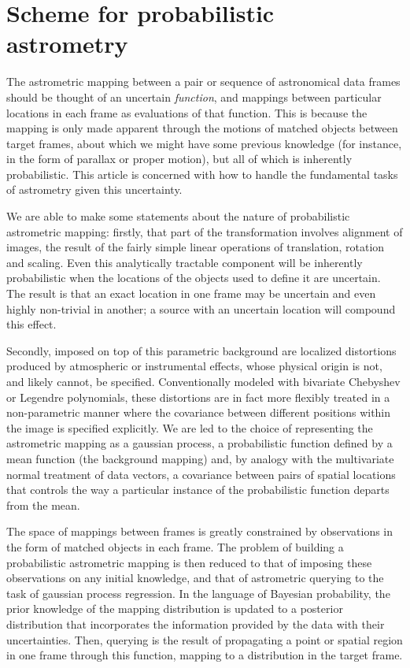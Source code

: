 \documentclass[manuscript]{aastex}
\begin{document}
\section{Scheme for probabilistic astrometry}\label{sec:scheme}
The astrometric mapping between a pair or sequence of astronomical data frames should be thought of an uncertain \emph{function}, and mappings between particular locations in each frame as evaluations of that function. This is because the mapping is only made apparent through the motions of matched objects between target frames, about which we might have some previous knowledge (for instance, in the form of parallax or proper motion), but all of which is inherently probabilistic. This article is concerned with how to handle the fundamental tasks of astrometry given this uncertainty.

We are able to make some statements about the nature of probabilistic astrometric mapping: firstly, that part of the transformation involves alignment of images, the result of the fairly simple linear operations of translation, rotation and scaling. Even this analytically tractable component will be inherently probabilistic when the locations of the objects used to define it are uncertain. The result is that an exact location in one frame may be uncertain and even highly non-trivial in another; a source with an uncertain location will compound this effect.

Secondly, imposed on top of this  parametric background are localized distortions produced by atmospheric or instrumental effects, whose physical origin is not, and likely cannot, be specified. Conventionally modeled with bivariate Chebyshev or Legendre polynomials, these distortions are in fact more flexibly treated in a non-parametric manner where the covariance between different positions within the image is specified explicitly. We are led to the choice of representing the astrometric mapping as a gaussian process, a probabilistic function defined by a mean function (the background mapping) and, by analogy with the multivariate normal treatment of data vectors, a covariance between pairs of spatial locations that controls the way a particular instance of the probabilistic function departs from the mean.

The space of mappings between frames is greatly constrained by observations in the form of matched objects in each frame. The problem of building a probabilistic astrometric mapping is then reduced to that of imposing these observations on any initial knowledge, and that of astrometric querying to the task of gaussian process regression. In the language of Bayesian probability, the prior knowledge of the mapping distribution is updated to a posterior distribution that incorporates the information provided by the data with their uncertainties. Then, querying is the result of propagating a point or spatial region in one frame through this function, mapping to a distribution in the target frame. 
\end{document}
